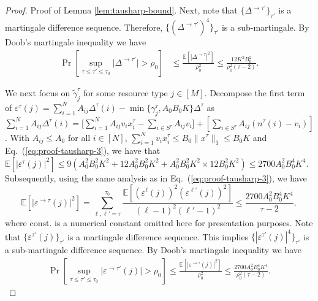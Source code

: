 \documentclass[opre]{informs3aa}
\renewcommand{\tilde}{\widetilde}
\renewcommand{\tilde}{\widetilde}
\newcommand{\const}{\mathrm{const}}
\begin{document}
\begin{proof}{Proof of Lemma \ref{lem:tausharp-bound}.}
Next, note that $\{\Delta^{\to\tau'}\}_{\tau'}$ is a martingale difference sequence. Therefore, $\{(\Delta^{\to\tau'})^4\}_{\tau'}$
is a sub-martingale. By Doob's martingale inequality we have 
\begin{align}
\Pr\left[\sup_{\tau\leq\tau'\leq\tau_0}\big|\Delta^{\to\tau'}\big|>\rho_0\right] 
&\leq \frac{\mathbb E[|\Delta^{\to\tau}|^2]}{\rho_0^2} \leq \frac{12K^2 B_0^2}{\rho_0^2(\tau-2)}.
\label{eq:proof-tausharp-3half}
\end{align}

We next focus on $\tilde\gamma^\tau_j$ for some resource type $j\in[M]$. 
Decompose the first term of $\varepsilon^\tau(j)=\sum_{i=1}^NA_{ij}\Delta^\tau(i)-\min\{\gamma^\tau_j,A_0B_0K\}\Delta^{\tau}$ as
$\sum_{i=1}^N A_{ij}\Delta^\tau(i) = \big[\sum_{i=1}^N A_{ij}v_ix^\tau_i - \sum_{i\in S^\tau}A_{ij}v_i\big] + 
[\sum_{i\in S^\tau} A_{ij}(n^\tau(i)-v_i)]$.
With $A_{ij}\leq A_0$ for all $i\in[N]$, $\sum_{i=1}^N v_ix^\tau_i\leq B_0\|x^\tau\|_1\leq B_0K$ and Eq.~(\ref{eq:proof-tausharp-3}), we have that
$\mathbb E[|\varepsilon^\tau(j)|^2] \leq 9(A_0^2B_0^2K^2 + 12A_0^2B_0^2K^2 + A_0^2B_0^2K^2\times 12B_0^2K^2)
\leq 2700 A_0^2B_0^4K^4.$
Subsequently, using the same analysis as in Eq.~(\ref{eq:proof-tausharp-3}), we have
\begin{equation}
\mathbb E[|\varepsilon^{\to\tau}(j)|^2] =\sum_{\ell,\ell'=\tau}^{\tau_0}\frac{\mathbb E[(\varepsilon^\ell(j))^2(\varepsilon^{\ell'}(j))^2]}{(\ell-1)^2(\ell'-1)^2}
\leq \frac{2700 A_0^2B_0^4K^4}{\tau-2},
\label{eq:proof-tausharp-4}
\end{equation}
where $\const.$ is a numerical constant omitted here for presentation purposes.
Note that $\{\varepsilon^{\tau'}(j)\}_{\tau'}$ is a martingale difference sequence. This implies $\{|\varepsilon^{\tau'}(j)|^4\}_{\tau'}$ is a sub-martingale difference sequence. By Doob's martingale inequality we have
\begin{align}
\Pr\left[\sup_{\tau\leq\tau'\leq\tau_0}\big|\varepsilon^{\to\tau'}(j)\big|>\rho_0\right]\leq \frac{\mathbb E[|\varepsilon^{\to\tau}(j)|^2]}{\rho_0^2}\leq \frac{2700 A_0^2B_0^4K^4}{\rho_0^2(\tau-2)}.
\label{eq:proof-tausharp-5}
\end{align}


\end{proof}
\end{document}
